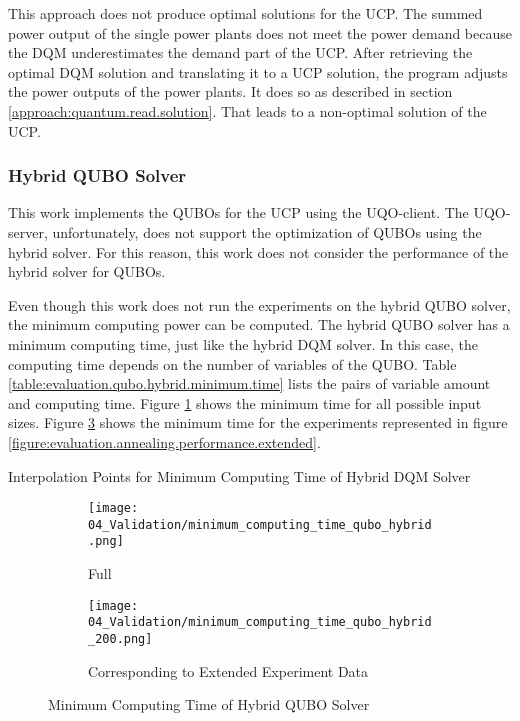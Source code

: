 This approach does not produce optimal solutions for the UCP.
The summed power output of the single power plants does not meet the power demand because the DQM underestimates the demand part of the UCP.
After retrieving the optimal DQM solution and translating it to a UCP solution, the program adjusts the power outputs of the power plants.
It does so as described in section \ref{approach:quantum.read.solution}.
That leads to a non-optimal solution of the UCP.

\subsubsection{Hybrid QUBO Solver}

This work implements the QUBOs for the UCP using the UQO-client.
The UQO-server, unfortunately, does not support the optimization of QUBOs using the hybrid solver.
For this reason, this work does not consider the performance of the hybrid solver for QUBOs.

Even though this work does not run the experiments on the hybrid QUBO solver, the minimum computing power can be computed.
The hybrid QUBO solver has a minimum computing time, just like the hybrid DQM solver.
In this case, the computing time depends on the number of variables of the QUBO.
Table \ref{table:evaluation.qubo.hybrid.minimum.time} lists the pairs of variable amount and computing time.
Figure \ref{figure:evaluation.qubo.hybrid.minimum.time} shows the minimum time for all possible input sizes.
Figure \ref{figure:evaluation.qubo.hybrid.minimum.time.200} shows the minimum time for the experiments represented in figure \ref{figure:evaluation.annealing.performance.extended}.
\begin{table}[ht]
  \centering
  
  \caption{Interpolation Points for Minimum Computing Time of Hybrid DQM Solver}
  \label{table:evaluation.qubo.hybrid.minimum.time}
\end{table}
\begin{figure} [ht]
  \begin{subfigure}[b]{0.5 \textwidth}
    \centering
    \texttt{[image: 04\_Validation/minimum\_computing\_time\_qubo\_hybrid.png]}
    \caption{Full}
    \label{figure:evaluation.qubo.hybrid.minimum.time}
  \end{subfigure}
  \begin{subfigure}[b]{0.5 \textwidth}
    \centering
    \texttt{[image: 04\_Validation/minimum\_computing\_time\_qubo\_hybrid\_200.png]}
    \caption{Corresponding to Extended Experiment Data}
    \label{figure:evaluation.qubo.hybrid.minimum.time.200}
  \end{subfigure}
  \caption{Minimum Computing Time of Hybrid QUBO Solver}
\end{figure}

